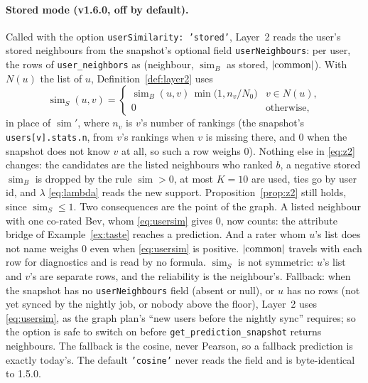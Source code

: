 \documentclass[11pt]{article}
\DeclarePairedDelimiter\abs{\lvert}{\rvert}
\DeclareMathOperator{\simi}{sim}
\newcommand{\code}[1]{\texttt{#1}}
\theoremstyle{plain}
\theoremstyle{definition}
\theoremstyle{remark}
\begin{document}
\paragraph{Stored mode (v1.6.0, off by default).} Called with the option \code{userSimilarity: 'stored'}, Layer~2 reads the user's stored neighbours from the snapshot's optional field \code{userNeighbours}: per user, the rows of \code{user\_neighbors} as (neighbour, $\simi_B$ as stored, $\abs{\mathrm{common}}$). With $N(u)$ the list of $u$, Definition~\ref{def:layer2} uses
\begin{equation}\label{eq:simstored}
\simi_S(u, v) = \begin{cases} \simi_B(u, v)\, \min\bigl(1, n_v / N_0\bigr) & v \in N(u), \\ 0 & \text{otherwise,} \end{cases}
\end{equation}
in place of $\simi'$, where $n_v$ is $v$'s number of rankings (the snapshot's \code{users[v].stats.n}, from $v$'s rankings when $v$ is missing there, and $0$ when the snapshot does not know $v$ at all, so such a row weighs $0$). Nothing else in \eqref{eq:z2} changes: the candidates are the listed neighbours who ranked $b$, a negative stored $\simi_B$ is dropped by the rule $\simi > 0$, at most $K = 10$ are used, ties go by user id, and $\lambda$ \eqref{eq:lambda} reads the new support. Proposition~\ref{prop:z2} still holds, since $\simi_S \le 1$. Two consequences are the point of the graph. A listed neighbour with one co-rated Bev, whom \eqref{eq:usersim} gives $0$, now counts: the attribute bridge of Example~\ref{ex:taste} reaches a prediction. And a rater whom $u$'s list does not name weighs $0$ even when \eqref{eq:usersim} is positive. $\abs{\mathrm{common}}$ travels with each row for diagnostics and is read by no formula. $\simi_S$ is not symmetric: $u$'s list and $v$'s are separate rows, and the reliability is the neighbour's. Fallback: when the snapshot has no \code{userNeighbours} field (absent or null), or $u$ has no rows (not yet synced by the nightly job, or nobody above the floor), Layer~2 uses \eqref{eq:usersim}, as the graph plan's ``new users before the nightly sync'' requires; so the option is safe to switch on before \code{get\_prediction\_snapshot} returns neighbours. The fallback is the cosine, never Pearson, so a fallback prediction is exactly today's. The default \code{'cosine'} never reads the field and is byte-identical to 1.5.0.
\end{document}
